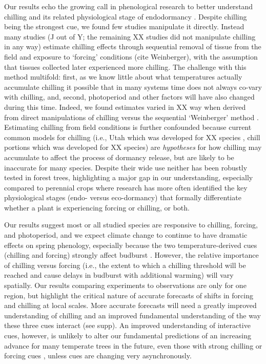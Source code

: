 \documentclass{article}
\begin{document}
\par Our results echo the growing call in phenological research to better understand chilling and its related physiological stage of endodormancy \citep{chuine2016}.  Despite chilling being the strongest cue, we found few studies manipulate it directly. Instead many studies (J out of Y; the remaining XX studies did not manipulate chilling in any way) estimate chilling effects through sequential removal of tissue from the field and exposure to `forcing' conditions (cite Weinberger), with the assumption that tissues collected later experienced more chilling. The challenge with this method multifold: first, as we know little about what temperatures actually accumulate chilling it possible that in many systems time does not always co-vary with chilling, and, second, photoperiod and other factors will have also changed during this time. Indeed, we found estimates varied in XX way when derived from direct manipulations of chilling versus the sequential `Weinberger' method \citep{weinberger1950,polgar2013}. Estimating chilling from field conditions is further confounded because current common models for chilling (i.e., Utah which was developed for XX species \citep{richardson1974}, chill portions which was developed for XX species) are \emph{hypotheses} for how chilling may accumulate to affect the process of dormancy release, but are likely to be inaccurate for many species. Despite their wide use neither has been robustly tested in forest trees, highlighting a major gap in our understanding, especially compared to perennial crops where research has more often identified the key physiological stages (endo- versus eco-dormancy) that formally differentiate whether a plant is experiencing forcing or chilling, or both. 

\par Our results suggest most or all studied species are responsive to chilling, forcing, and photoperiod, and we expect climate change to continue to have dramatic effects on spring phenology, especially because the two temperature-derived cues (chilling and forcing) strongly affect budburst  \citep{Laube:2014a}. However, the relative importance of chilling versus forcing (i.e., the extent to which a chilling threshold will be reached and cause delays in budburst with additional warming) will vary spatially. Our results comparing experiments to observations are only for one region, but highlight the critical nature of accurate forecasts of shifts in forcing and chilling at local scales. More accurate forecasts will need a greatly improved understanding of chilling and an improved fundamental understanding of the way these three cues interact (see supp). An improved understanding of interactive cues, however, is unlikely to alter our fundamental predictions of an increasing advance for many temperate trees in the future, even those with strong chilling or forcing cues \citep{gauzere2017}, unless cues are changing very asynchronously. %
\end{document}

